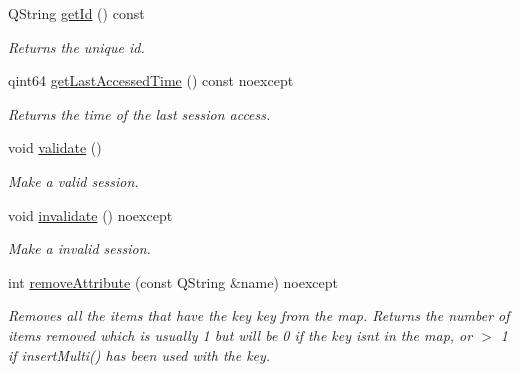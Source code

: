 \begin{DoxyCompactItemize}
\mbox{\label{class_session_acc9bbd9936d3f324fb30c3d6f5a102a7}} 
Q\+String \hyperlink{class_session_acc9bbd9936d3f324fb30c3d6f5a102a7}{get\+Id} () const
\begin{DoxyCompactList}\small\item\em Returns the unique id. \end{DoxyCompactList}\item 
\mbox{\label{class_session_abefcd2f77928404263a3583037d892e2}} 
qint64 \hyperlink{class_session_abefcd2f77928404263a3583037d892e2}{get\+Last\+Accessed\+Time} () const noexcept
\begin{DoxyCompactList}\small\item\em Returns the time of the last session access. \end{DoxyCompactList}\item 
\mbox{\label{class_session_a0d4d1f80fdc47692172b3d3e2175df86}} 
void \hyperlink{class_session_a0d4d1f80fdc47692172b3d3e2175df86}{validate} ()
\begin{DoxyCompactList}\small\item\em Make a valid session. \end{DoxyCompactList}\item 
\mbox{\label{class_session_abc80e67b2310fa99f07528e1a3107a71}} 
void \hyperlink{class_session_abc80e67b2310fa99f07528e1a3107a71}{invalidate} () noexcept
\begin{DoxyCompactList}\small\item\em Make a invalid session. \end{DoxyCompactList}\item 
\mbox{\label{class_session_a7fd8e74f40cb93cb23cb9a434c338717}} 
int \hyperlink{class_session_a7fd8e74f40cb93cb23cb9a434c338717}{remove\+Attribute} (const Q\+String \&name) noexcept
\begin{DoxyCompactList}\small\item\em Removes all the items that have the key key from the map. Returns the number of items removed which is usually 1 but will be 0 if the key isn\textquotesingle{}t in the map, or $>$ 1 if insert\+Multi() has been used with the key. \end{DoxyCompactList}\item 
\mbox{\label{class_session_afe6cfc02c901d3f27924107067f83189}} 

\end{DoxyCompactItemize}
